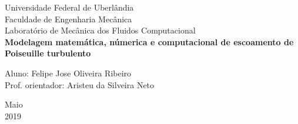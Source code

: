 \begin{titlepage}
	\begin{center}
	

		\Huge{Universidade Federal de Uberlândia}\\
		\large{Faculdade de Engenharia Mecânica}\\ 
		\large{Laboratório de Mecânica dos Fluidos Computacional}\\ 
		\vspace{15pt}
        \vspace{95pt}
        \textbf{\LARGE{Modelagem matemática, númerica e computacional de escoamento de Poiseuille
        		turbulento}}\\
		\vspace{7,5cm}
	\end{center}
	
	\begin{flushleft}
		\begin{tabbing}
			Aluno: Felipe Jose Oliveira Ribeiro \\
			Prof. orientador: Aristeu da Silveira Neto \\
	    \end{tabbing}
    \end{flushleft}
	\vspace{1cm}
	
	\begin{center}
		\vspace{\fill}
			 Maio\\
		 2019
			\end{center}
\end{titlepage}


